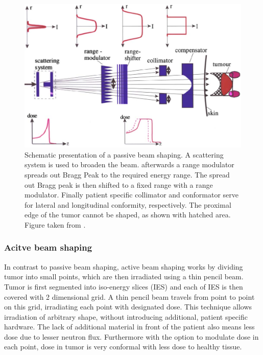 \documentclass[type=dr, dr=rernat, accentcolor=tud7b,colorbacktitle, bigchapter, openright, twoside, 12pt ]{tudthesis}
\begin{document}
\begin{figure}[H]
\begin{center}
\includegraphics[scale=0.4]{./Images/deliverypassive.png}
\caption{Schematic presentation of a passive beam shaping. A scattering system is used to broaden the beam. afterwards a range modulator spreads out Bragg Peak to the required energy range.
The spread out Bragg peak is then shifted to a fixed range with a range modulator. Finally patient specific collimator and conformator serve for lateral and longitudinal conformity, respectively.
The proximal edge of the tumor cannot be shaped, as shown with hatched area. Figure taken from \cite{Sch10}.}
\label{passive}
\end{center}
\end{figure}

\subsubsection{Acitve beam shaping}

In contrast to passive beam shaping, active beam shaping works by dividing tumor into small points, which are then irradiated using a thin pencil beam. Tumor is first segmented into iso-energy slices (IES) and each of IES
is then covered with 2 dimensional grid. A thin pencil beam travels from point to point on this grid, irradiating each point with designated dose. This technique allows irradiation of arbitrary shape, without introducing additional, patient specific 
hardware. The lack of additional material in front of the patient also means less dose due to lesser neutron flux. Furthermore with the option to modulate dose in each point, dose in tumor is very conformal with less dose to healthy tissue.
\end{document}
